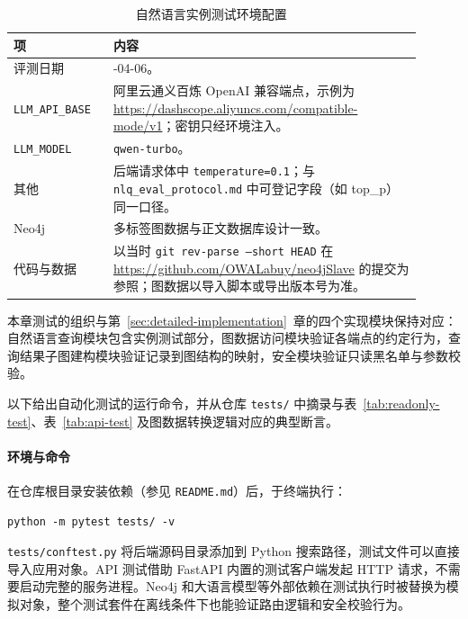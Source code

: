 \documentclass[12pt,a4paper]{article}
\begin{document}
\begin{table}[H]
    \centering
    \captionsetup{justification=centering, singlelinecheck=false}
    \caption[自然语言实例测试环境配置表]{自然语言实例测试环境配置}
    \label{tab:eval-runtime}
    \small
    \setlength{\tabcolsep}{5pt}
    \begin{tabular}{>{\RaggedRight\arraybackslash}p{0.22\linewidth} >{\RaggedRight\arraybackslash}p{0.68\linewidth}}
        \toprule
        \textbf{项} & \textbf{内容} \\
        \midrule
        评测日期 & 2026-04-06。 \\
        \texttt{LLM\_API\_BASE} & 阿里云通义百炼 OpenAI 兼容端点，示例为 \url{https://dashscope.aliyuncs.com/compatible-mode/v1}；密钥只经环境注入。 \\
        \texttt{LLM\_MODEL} & \texttt{qwen-turbo}。 \\
        其他 & 后端请求体中 \texttt{temperature=0.1}；与 \texttt{nlq\_eval\_protocol.md} 中可登记字段（如 top\_p）同一口径。 \\
        Neo4j & 多标签图数据与正文数据库设计一致。 \\
        代码与数据 & 以当时 \texttt{git rev-parse --short HEAD} 在\url{https://github.com/OWALabuy/neo4jSlave} 的提交为参照；图数据以导入脚本或导出版本号为准。 \\
        \bottomrule
    \end{tabular}
\end{table}

本章测试的组织与第~\ref{sec:detailed-implementation}~章的四个实现模块保持对应：自然语言查询模块包含实例测试部分，图数据访问模块验证各端点的约定行为，查询结果子图建构模块验证记录到图结构的映射，安全模块验证只读黑名单与参数校验。

以下给出自动化测试的运行命令，并从仓库 \texttt{tests/} 中摘录与表~\ref{tab:readonly-test}、表~\ref{tab:api-test} 及图数据转换逻辑对应的典型断言。

\paragraph{环境与命令}
在仓库根目录安装依赖（参见 \texttt{README.md}）后，于终端执行：
\begin{verbatim}
python -m pytest tests/ -v
\end{verbatim}
\texttt{tests/conftest.py} 将后端源码目录添加到 Python 搜索路径，测试文件可以直接导入应用对象。API 测试借助 FastAPI 内置的测试客户端发起 HTTP 请求，不需要启动完整的服务进程。Neo4j 和大语言模型等外部依赖在测试执行时被替换为模拟对象，整个测试套件在离线条件下也能验证路由逻辑和安全校验行为。
\end{document}
